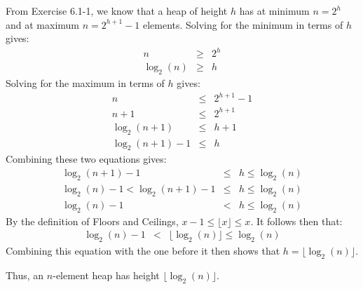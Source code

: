 From Exercise 6.1-1, we know that a heap of height $h$ has at minimum $n = 2^h$ and at maximum $n = 2^{h+1} - 1$ elements. Solving for the minimum in terms of $h$ gives:
\begin{eqnarray*}
	n & \geq & 2^h \\
	\log_2(n) & \geq & h
\end{eqnarray*}
Solving for the maximum in terms of $h$ gives:
\begin{eqnarray*}
	n & \leq & 2^{h+1} - 1 \\
	n + 1 & \leq & 2^{h+1} \\
	\log_2(n+1) & \leq & h + 1 \\
	\log_2(n+1) - 1 & \leq & h
\end{eqnarray*}
Combining these two equations gives:
\begin{eqnarray*}
	\log_2(n+1) - 1& \leq & h \leq \log_2(n) \\
	\log_2(n) - 1 < \log_2(n+1) - 1 & \leq & h \leq \log_2(n) \\
	\log_2(n) - 1 & < & h \leq \log_2(n)
\end{eqnarray*}
By the definition of Floors and Ceilings, $x - 1 \leq \lfloor x \rfloor \leq x$. It follows then that:
\begin{eqnarray*}
	\log_2(n) - 1 & < & \lfloor \log_2(n) \rfloor \leq \log_2(n)
\end{eqnarray*}
Combining this equation with the one before it then shows that $h = \lfloor \log_2(n) \rfloor$.

Thus, an $n$-element heap has height $\lfloor \log_2(n) \rfloor$.
